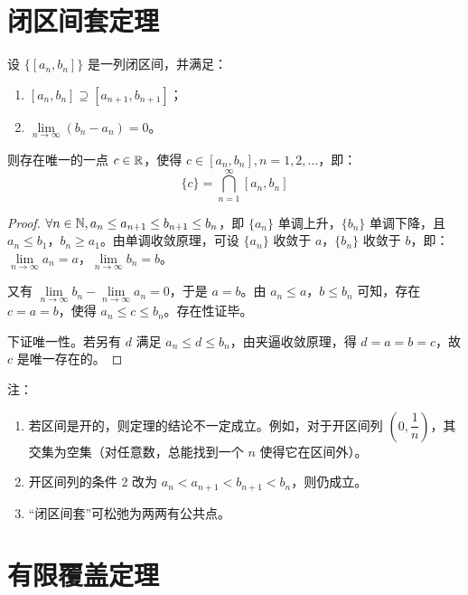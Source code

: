 
\section{闭区间套定理}

\begin{theorem}[闭区间套定理]
	设 $\{[a_n, b_n]\}$ 是一列闭区间，并满足：

	\begin{enumerate}
		\item $[a_n, b_n] \supseteq [a_{n + 1}, b_{n + 1}]$；
		\item $\lim\limits_{n \rightarrow \infty} (b_n - a_n) = 0$。
	\end{enumerate}

	则存在唯一的一点 $c \in \mathbb R$，使得 $c \in [a_n, b_n], n = 1, 2, \ldots$，即：
	$$
	\{c\} = \bigcap_{n = 1}^{\infty} [a_n, b_n]
	$$
\end{theorem}

\begin{proof}
	$\forall n \in \mathbb N, a_n \le a_{n + 1} \le b_{n + 1} \le b_n$，即 $\{a_n\}$ 单调上升，$\{b_n\}$ 单调下降，且 $a_n \le b_1$，$b_n \ge a_1$。由单调收敛原理，可设 $\{a_n\}$ 收敛于 $a$，$\{b_n\}$ 收敛于 $b$，即：$\lim\limits_{n \rightarrow \infty} a_n = a$，$\lim\limits_{n \rightarrow \infty} b_n = b$。

	又有 $\lim\limits_{n \rightarrow \infty} b_n - \lim\limits_{n \rightarrow \infty} a_n = 0$，于是 $a = b$。由 $a_n \le a$，$b \le b_n$ 可知，存在 $c = a = b$，使得 $a_n \le c \le b_n$。存在性证毕。

	下证唯一性。若另有 $d$ 满足 $a_n \le d \le b_n$，由夹逼收敛原理，得 $d = a = b = c$，故 $c$ 是唯一存在的。
\end{proof}

注：

\begin{enumerate}
	\item 若区间是开的，则定理的结论不一定成立。例如，对于开区间列 $(0, \dfrac{1}{n})$，其交集为空集（对任意数，总能找到一个 $n$ 使得它在区间外）。
	\item 开区间列的条件 2 改为 $a_n < a_{n + 1} < b_{n + 1} < b_n$，则仍成立。
	\item “闭区间套”可松弛为两两有公共点。
\end{enumerate}

\section{有限覆盖定理}

